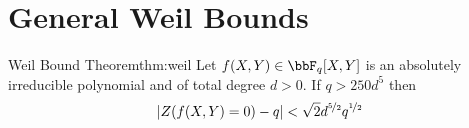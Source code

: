 \section{General Weil Bounds}
\begin{Theorem}{Weil Bound Theorem}{thm:weil}
  Let $f(X,Y)\in\bbF_q[X,Y]$ is an absolutely irreducible polynomial and of total degree $d>0$. If $q>250d^5$ then $$|Z(f(X,Y)=0)-q|<\sqrt{2}d^{\nicefrac52}q^{\nicefrac12}$$
\end{Theorem}